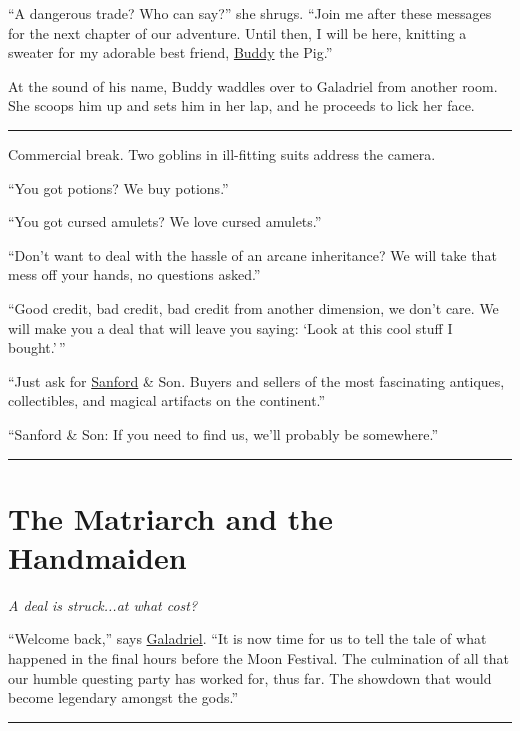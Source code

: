 \documentclass[smalldemyvopaper,11pt,twoside,onecolumn,openright,extrafontsizes]{memoir}
\newcommand{\chapdesc}[1]{
    \begin{flushright}
    \emph{{#1}}
    \end{flushright}
    \vspace{26pt}
}
\begin{document}
``A dangerous trade? Who can say?'' she shrugs. ``Join me after these
messages for the next chapter of our adventure. Until then, I will be
here, knitting a sweater for my adorable best friend,
\href{/characters/buddy/}{Buddy} the Pig.''

At the sound of his name, Buddy waddles over to Galadriel from another
room. She scoops him up and sets him in her lap, and he proceeds to lick
her face.

\begin{center}\rule{0.5\linewidth}{\linethickness}\end{center}

Commercial break. Two goblins in ill-fitting suits address the camera.

``You got potions? We buy potions.''

``You got cursed amulets? We love cursed amulets.''

``Don't want to deal with the hassle of an arcane inheritance? We will
take that mess off your hands, no questions asked.''

``Good credit, bad credit, bad credit from another dimension, we don't
care. We will make you a deal that will leave you saying: `Look at this
cool stuff I bought.'\,''

``Just ask for \href{/characters/sanford/}{Sanford} \& Son. Buyers and
sellers of the most fascinating antiques, collectibles, and magical
artifacts on the continent.''

``Sanford \& Son: If you need to find us, we'll probably be somewhere.''

\begin{center}\rule{0.5\linewidth}{\linethickness}\end{center}


\chapter{The Matriarch and the Handmaiden}
\chapdesc{A deal is struck...at what cost?}

``Welcome back,'' says \href{/characters/galadriel/}{Galadriel}. ``It is
now time for us to tell the tale of what happened in the final hours
before the Moon Festival. The culmination of all that our humble
questing party has worked for, thus far. The showdown that would become
legendary amongst the gods.''

\begin{center}\rule{0.5\linewidth}{\linethickness}\end{center}
\end{document}
